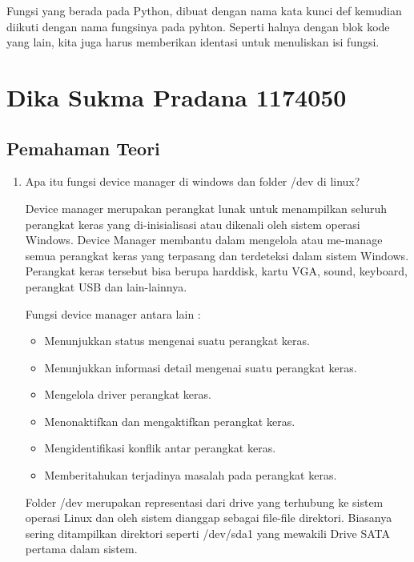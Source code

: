 \hfill \break
Fungsi yang berada pada Python, dibuat dengan nama kata kunci def kemudian diikuti dengan nama fungsinya pada pyhton.
Seperti halnya dengan blok kode yang lain, kita juga harus memberikan identasi untuk menuliskan isi fungsi.

\section{Dika Sukma Pradana 1174050}
	\subsection{Pemahaman Teori}
		\begin{enumerate}
			\item Apa itu fungsi device manager di windows dan folder /dev di linux?
				\par
				Device manager merupakan perangkat lunak untuk menampilkan seluruh perangkat keras yang di-inisialisasi atau dikenali oleh sistem operasi Windows. Device Manager membantu dalam mengelola atau me-manage semua perangkat keras yang terpasang dan terdeteksi dalam sistem Windows. Perangkat keras tersebut bisa berupa harddisk, kartu VGA, sound, keyboard, perangkat USB dan lain-lainnya.
				
				\par
				Fungsi device manager antara lain :
					\begin{itemize}
						\item Menunjukkan status mengenai suatu perangkat keras.
						\item Menunjukkan informasi detail mengenai suatu perangkat keras.
						\item Mengelola driver perangkat keras.
						\item Menonaktifkan dan mengaktifkan perangkat keras.
						\item Mengidentifikasi konflik antar perangkat keras.
						\item Memberitahukan terjadinya masalah pada perangkat keras.
					\end{itemize}

				\par
				Folder /dev merupakan representasi dari drive yang terhubung ke sistem operasi Linux dan oleh sistem dianggap sebagai file-file direktori. Biasanya sering ditampilkan direktori seperti /dev/sda1 yang mewakili Drive SATA pertama dalam sistem.
				

\end{enumerate}
